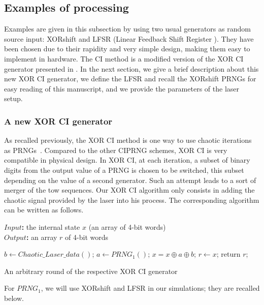 \subsection{Examples of processing}

Examples are given in this subsection by using two usual generators as random source input: XORshift and LFSR (Linear Feedback Shift Register \cite{beker1982cipher}). 
They have been chosen due to their rapidity and very simple design,
making them easy to implement in hardware. 
The CI method is a modified version of the XOR CI generator presented in \cite{DBLP:journals/corr/abs-1112-5239}. 
In the next section, we give a brief description about this new XOR CI generator, 
we define the LFSR and recall the XORshift PRNGs for easy reading of this manuscript, and we provide the parameters  of the laser setup.

\subsubsection{A new XOR CI generator}

As recalled previously, the XOR CI method is one way to use chaotic iterations
as PRNGs~\cite{DBLP:journals/corr/abs-1112-5239}. Compared to the other CIPRNG schemes, 
XOR CI is very compatible in physical design. In XOR CI, at each iteration, a subset of
binary digits from the output value of a PRNG is chosen to be switched, this subset
depending on the value of a second generator. 
Such an attempt leads to a sort of merger of the tow sequences. 
Our XOR CI algorithm only consists in adding the chaotic signal
provided by the laser into his process.
The corresponding algorithm can be written as follows.

\begin{algorithm}
\textbf{$Input$:} the internal state $x$ (an array of 4-bit words)\\
\textbf{$Output$:} an array $r$ of 4-bit words
\begin{algorithmic}[1]
\STATE$b\leftarrow{Chaotic\_Laser\_data()}$;
\STATE$a\leftarrow{PRNG_1()}$;
\STATE$x = x \oplus a \oplus b$;
\STATE$r\leftarrow{x}$;
\STATE return $r$;
\medskip
\caption{An arbitrary round of the respective XOR CI generator}
\label{XOR CI}
\end{algorithmic}
\end{algorithm}

For $PRNG_1$, we will use XORshift and LFSR in our simulations; they are recalled below.

